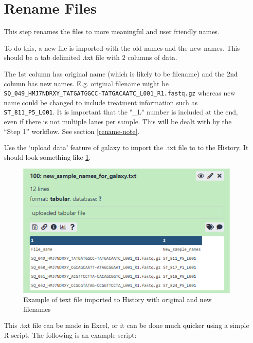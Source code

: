 \documentclass[
]{book}
\begin{document}
\hypertarget{rename-files}{%
\section{Rename Files}\label{rename-files}}

This step renames the files to more meaningful and user friendly names.

To do this, a new file is imported with the old names and the new names. This should be a tab delimited .txt file with 2 columns of data.

The 1st column has original name (which is likely to be filename) and the 2nd column has new names. E.g. original filename might be \texttt{SQ\_049\_HMJ7NDRXY\_TATGATGGCC-TATGACAATC\_L001\_R1.fastq.gz} whereas new name could be changed to include treatment information such as \texttt{ST\_811\_P5\_L001}.
It is important that the "\_L" number is included at the end, even if there is not multiple lanes per sample. This will be dealt with by the ``Step 1'' workflow. See section \ref{rename-note}.

Use the `upload data' feature of galaxy to import the .txt file to to the History. It should look something like \ref{fig:example-rename}.

\begin{figure}

{\centering \includegraphics[width=1\linewidth]{images/image009} 

}

\caption{Example of text file imported to History with original and new filenames}\label{fig:example-rename}
\end{figure}

This .txt file can be made in Excel, or it can be done much quicker using a simple R script. The following is an example script:
\end{document}
